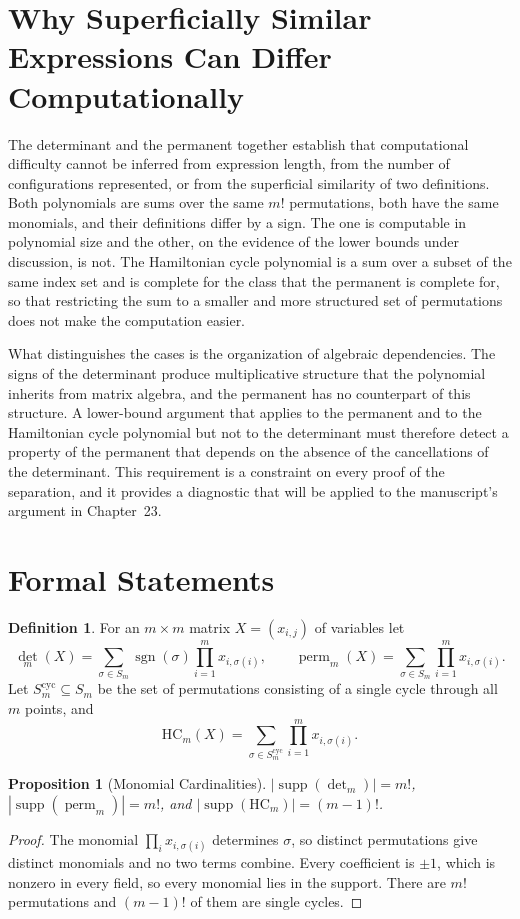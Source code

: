 \documentclass[11pt,letterpaper]{report}
\theoremstyle{plain}
\newtheorem{proposition}[theorem]{Proposition}
\theoremstyle{definition}
\newtheorem{definition}[theorem]{Definition}
\theoremstyle{remark}
\DeclareMathOperator{\sgn}{sgn}
\DeclareMathOperator{\perm}{perm}
\begin{document}
\section{Why Superficially Similar Expressions Can Differ Computationally}

The determinant and the permanent together establish that computational difficulty cannot be inferred from expression length, from the number of configurations represented, or from the superficial similarity of two definitions. Both polynomials are sums over the same $m!$ permutations, both have the same monomials, and their definitions differ by a sign. The one is computable in polynomial size and the other, on the evidence of the lower bounds under discussion, is not. The Hamiltonian cycle polynomial is a sum over a subset of the same index set and is complete for the class that the permanent is complete for, so that restricting the sum to a smaller and more structured set of permutations does not make the computation easier.

What distinguishes the cases is the organization of algebraic dependencies. The signs of the determinant produce multiplicative structure that the polynomial inherits from matrix algebra, and the permanent has no counterpart of this structure. A lower-bound argument that applies to the permanent and to the Hamiltonian cycle polynomial but not to the determinant must therefore detect a property of the permanent that depends on the absence of the cancellations of the determinant. This requirement is a constraint on every proof of the separation, and it provides a diagnostic that will be applied to the manuscript's argument in Chapter~23.

\section{Formal Statements}

\begin{definition}
For an $m\times m$ matrix $X=(x_{i,j})$ of variables let
\[
\det_m(X)=\sum_{\sigma\in S_m}\sgn(\sigma)\prod_{i=1}^{m}x_{i,\sigma(i)},\qquad
\perm_m(X)=\sum_{\sigma\in S_m}\prod_{i=1}^{m}x_{i,\sigma(i)}.
\]
Let $S_m^{\mathrm{cyc}}\subseteq S_m$ be the set of permutations consisting of a single cycle through all $m$ points, and
\[
\mathrm{HC}_m(X)=\sum_{\sigma\in S_m^{\mathrm{cyc}}}\prod_{i=1}^{m}x_{i,\sigma(i)}.
\]
\end{definition}

\begin{proposition}[Monomial Cardinalities]
$|\operatorname{supp}(\det_m)|=m!$, $|\operatorname{supp}(\perm_m)|=m!$, and $|\operatorname{supp}(\mathrm{HC}_m)|=(m-1)!$.
\end{proposition}
\begin{proof}
The monomial $\prod_ix_{i,\sigma(i)}$ determines $\sigma$, so distinct permutations give distinct monomials and no two terms combine. Every coefficient is $\pm1$, which is nonzero in every field, so every monomial lies in the support. There are $m!$ permutations and $(m-1)!$ of them are single cycles.
\end{proof}
\end{document}

